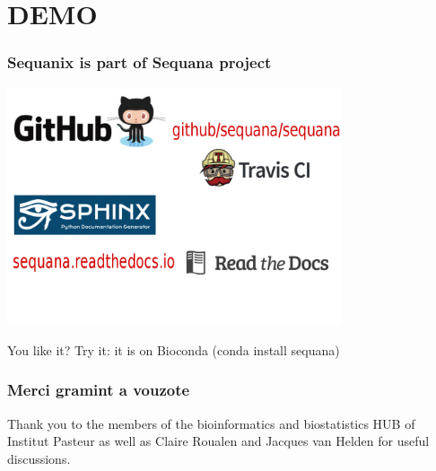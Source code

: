 \documentclass{beamer}
\begin{document}
\section{DEMO}



\begin{frame}
\frametitle{Sequanix is part of Sequana project}
\centering
\includegraphics[scale=0.3, height=7cm]{images/logo.png}

You like it? Try it: it is on Bioconda (conda install sequana)
\end{frame}


\begin{frame}
\frametitle{Merci gramint a vouzote}
Thank you to the members of the bioinformatics and biostatistics HUB of 
Institut Pasteur as well as  Claire Roualen and Jacques van Helden for useful 
discussions.

\end{frame}
\end{document}
